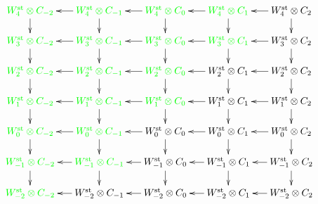 \[
	\xymatrix@R=.5cm@C=.5cm{
		\green{\Wst[4] \ot  C_{-2}}\ar[d] &
		\green{\Wst[4] \ot  C_{-1}}\ar[d]\ar[l] &
		\green{\Wst[4] \ot  C_{0}}\ar[d]\ar[l] &
		\green{\Wst[4] \ot  C_{1}}\ar[d]\ar[l] &
		\Wst[4] \ot  C_{2}\ar[d]\ar[l]
		\\
		\green{\Wst[3] \ot  C_{-2}}\ar[d] &
		\green{\Wst[3] \ot  C_{-1}}\ar[d]\ar[l] &
		\green{\Wst[3] \ot  C_{0}}\ar[d]\ar[l] &
		\green{\Wst[3] \ot  C_{1}}\ar[d]\ar[l] &
		\Wst[3] \ot  C_{2}\ar[d]\ar[l]
		\\
		\green{\Wst[2] \ot  C_{-2}}\ar[d] &
		\green{\Wst[2] \ot  C_{-1}}\ar[d]\ar[l] &
		\green{\Wst[2] \ot  C_{0}}\ar[d]\ar[l] &
		\Wst[2] \ot  C_{1}\ar[d]\ar[l] &
		\Wst[2] \ot  C_{2}\ar[d]\ar[l]
		\\
		\green{\Wst[1] \ot  C_{-2}}\ar[d] &
		\green{\Wst[1] \ot  C_{-1}}\ar[d]\ar[l] &
		\green{\Wst[1] \ot  C_{0}}\ar[d]\ar[l] &
		\Wst[1] \ot  C_{1}\ar[d]\ar[l] &
		\Wst[1] \ot  C_{2}\ar[d]\ar[l]
		\\
		\green{\Wst[0] \ot  C_{-2}}\ar[d] &
		\green{\Wst[0] \ot  C_{-1}}\ar[d]\ar[l] &
		\Wst[0] \ot  C_{0}\ar[d]\ar[l] &
		\Wst[0] \ot  C_{1}\ar[d]\ar[l] &
		\Wst[0] \ot  C_{2}\ar[d]\ar[l]
		\\
		\green{\Wst[-1] \ot  C_{-2}}\ar[d] &
		\green{\Wst[-1] \ot  C_{-1}}\ar[d]\ar[l] &
		\Wst[-1] \ot  C_{0}\ar[d]\ar[l] &
		\Wst[-1] \ot  C_{1}\ar[d]\ar[l] &
		\Wst[-1] \ot  C_{2}\ar[d]\ar[l]
		\\
		\green{\Wst[-2] \ot  C_{-2}} &
		\Wst[-2] \ot  C_{-1}\ar[l] &
		\Wst[-2] \ot  C_{0}\ar[l] &
		\Wst[-2] \ot  C_{1}\ar[l] &
		\Wst[-2] \ot  C_{2}\ar[l]
}
\]